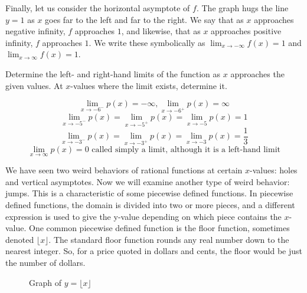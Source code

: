Finally, let us consider the horizontal asymptote of $f$. The graph hugs the line 
$y = 1$ as $x$ goes far to the left and far to the right. We say that as $x$ 
approaches negative infinity, $f$ approaches $1$, and likewise, that as $x$ 
approaches positive infinity, $f$ approaches $1$. We write these symbolically as 
$\lim_{x \rightarrow -\infty} f(x) = 1$ and $\lim_{x \rightarrow \infty} f(x) = 1$. 

\begin{Exercise}[title=Limits Practice 1, label=limits1]
  Determine the left- and right-hand limits of the function as $x$ approaches the 
  given values. At $x$-values where the limit exists, determine it.
  \vspace{40mm}
\end{Exercise}
\begin{Answer}[ref=limits1] 
	$$ \lim_{x \rightarrow -6^-} p(x) = -\infty, \lim_{x \rightarrow -6^+} p(x) = \infty $$
	$$ \lim_{x \rightarrow -5^-} p(x) = \lim_{x \rightarrow -5^+} p(x) = \lim_{x \rightarrow -5} p(x) = 1 $$
	$$ \lim_{x \rightarrow -3^-} p(x) = \lim_{x \rightarrow -3^+} p(x) = \lim_{x \rightarrow -3} p(x) = \frac{1}{3} $$
	$$ \lim_{x \rightarrow \infty} p(x) = 0 \text{ called simply a limit, although it is a left-hand limit} $$
\end{Answer}

We have seen two weird behaviors of rational functions at certain $x$-values: holes 
and vertical asymptotes. Now we will examine another type of weird behavior: jumps. 
This is a characteristic of some piecewise defined functions. In piecewise defined 
functions, the domain is divided into two or more pieces, and a different 
expression is used to give the y-value depending on which piece contains the $x$-
value. One common piecewise defined function is the floor function, sometimes 
denoted $\lfloor x \rfloor$. The standard floor function rounds any real number 
down to the nearest integer. So, for a price quoted in dollars and cents, the floor 
would be just the number of dollars.

\begin{figure}[htbp]
  \centering
  \caption{Graph of \( y = \lfloor x \rfloor \)}
\end{figure}	

